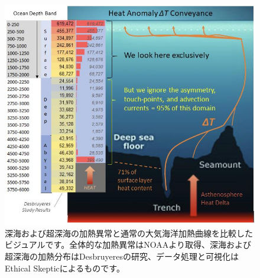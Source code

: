 \documentclass[10pt,twocolumn,letterpaper]{article}
\begin{document}
\begin{figure}[t]
\begin{center}

\includegraphics[width=1\textwidth]{deepsea.jpg}
\end{center}
   \caption{深海および超深海の加熱異常と通常の大気海洋加熱曲線を比較したビジュアルです。全体的な加熱異常はNOAAより取得\cite{147}、深海および超深海の加熱分布はDesbruyeresの研究\cite{132}、データ処理と可視化はEthical Skepticによるものです\cite{129}。}
\label{fig:21}
\end{figure}
\end{document}
